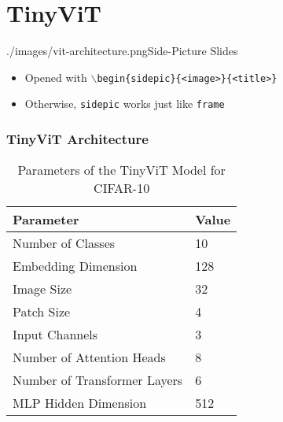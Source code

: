 \section{TinyViT}

    \begin{sidepic}{./images/vit-architecture.png}{Side-Picture Slides}
        \begin{itemize}
        \item Opened with \texttt{$\backslash$begin\{sidepic\}\{<image>\}\{<title>\}}
        \item Otherwise, \texttt{sidepic} works just like \texttt{frame}
        \end{itemize}
    \end{sidepic}


\begin{frame}[fragile]
    \frametitle{TinyViT Architecture}
    \begin{table}[htbp]
        \small
        \centering
        \caption{Parameters of the TinyViT Model for CIFAR-10}
        \begin{tabular}{@{}ll@{}}
          \toprule
          \textbf{Parameter} & \textbf{Value} \\
          \midrule
          Number of Classes & 10 \\
          Embedding Dimension & 128 \\
          Image Size & 32 \\
          Patch Size & 4 \\
          Input Channels & 3 \\
          Number of Attention Heads & 8 \\
          Number of Transformer Layers & 6 \\
          MLP Hidden Dimension & 512 \\
          \bottomrule
        \end{tabular}
      \end{table}
\end{frame}